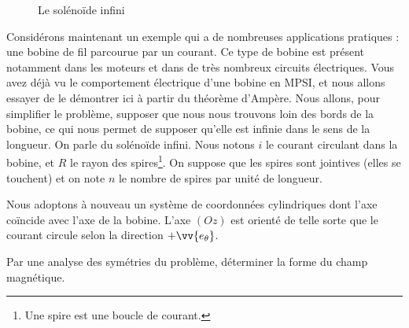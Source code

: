\documentclass[11pt,fleqn]{book} %
\begin{document}
\begin{figure}[htbp]

    
    \caption{Le solénoïde infini}
    \label{fig:placeholder}
\end{figure}

Considérons maintenant un exemple qui a de nombreuses applications pratiques : une bobine de fil parcourue par un courant. Ce type de bobine est présent notamment dans les moteurs et dans de très nombreux circuits électriques. Vous avez déjà vu le comportement électrique d'une bobine en MPSI, et nous allons essayer de le démontrer ici à partir du théorème d'Ampère. Nous allons, pour simplifier le problème, supposer que nous nous trouvons loin des bords de la bobine, ce qui nous permet de supposer qu'elle est infinie dans le sens de la longueur. On parle du solénoïde infini. Nous notons $i$ le courant circulant dans la bobine, et $R$ le rayon des spires\footnote{Une spire est une boucle de courant.}. On suppose que les spires sont jointives (elles se touchent) et on note $n$ le nombre de spires par unité de longueur.

Nous adoptons à nouveau un système de coordonnées cylindriques dont l'axe coïncide avec l'axe de la bobine. L'axe $(Oz)$ est orienté de telle sorte que le courant circule selon la direction $+\vv{e_\theta}$.

\begin{capex}
Par une analyse des symétries du problème, déterminer la forme du champ magnétique.
\end{capex}

%
%
\end{document}
